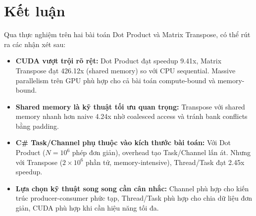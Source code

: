 \documentclass[12pt,a4paper]{article}
\begin{document}
\section{Kết luận}

Qua thực nghiệm trên hai bài toán Dot Product và Matrix Transpose, có thể rút ra các nhận xét sau:

\begin{itemize}
    \item \textbf{CUDA vượt trội rõ rệt:} Dot Product đạt speedup 9.41x, Matrix Transpose đạt 426.12x (shared memory) so với CPU sequential. Massive parallelism trên GPU phù hợp cho cả bài toán compute-bound và memory-bound.
    \item \textbf{Shared memory là kỹ thuật tối ưu quan trọng:} Transpose với shared memory nhanh hơn naive 4.24x nhờ coalesced access và tránh bank conflicts bằng padding.
    \item \textbf{C\# Task/Channel phụ thuộc vào kích thước bài toán:} Với Dot Product ($N = 10^6$ phép đơn giản), overhead tạo Task/Channel lấn át. Nhưng với Transpose ($2 \times 10^6$ phần tử, memory-intensive), Thread/Task đạt 2.45x speedup.
    \item \textbf{Lựa chọn kỹ thuật song song cần cân nhắc:} Channel phù hợp cho kiến trúc producer-consumer phức tạp, Thread/Task phù hợp cho chia dữ liệu đơn giản, CUDA phù hợp khi cần hiệu năng tối đa.
\end{itemize}
\end{document}
